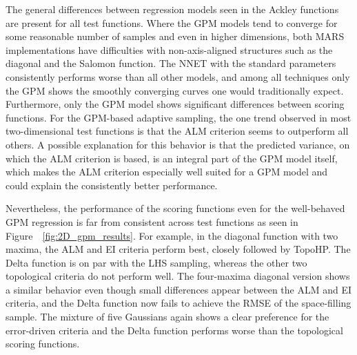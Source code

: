 The general differences between regression models seen in the Ackley functions are present for all test functions.
%
Where the GPM models tend to converge for some reasonable number of samples and even in higher dimensions, both MARS implementations have difficulties with non-axis-aligned structures such as the diagonal and the Salomon function.
%
The NNET with the standard parameters consistently performs worse than all other models, and among all techniques only the GPM shows the smoothly converging curves one would traditionally expect.
%
Furthermore, only the GPM model shows significant differences between scoring functions.
%
For the GPM-based adaptive sampling, the one trend observed in most two-dimensional test functions is that the ALM criterion seems to outperform all others.
%
A possible explanation for this behavior is that the predicted variance, on which the ALM criterion is based, is an integral part of the GPM model itself, which makes the ALM criterion especially well suited for a GPM model and could explain the consistently better performance.

Nevertheless, the performance of the scoring functions even for the well-behaved GPM regression is far from consistent across test functions as seen in Figure~~\ref{fig:2D_gpm_results}.
%
For example, in the diagonal function with two maxima, the ALM and EI criteria perform best, closely followed by TopoHP.
%
The Delta function is on par with the LHS sampling, whereas the other two topological criteria do not perform well.
%
The four-maxima diagonal version shows a similar behavior even though small differences appear between the ALM and EI criteria, and the Delta function now fails to achieve the RMSE of the space-filling sample.
%
The mixture of five Gaussians again shows a clear preference for the error-driven criteria and the Delta function performs worse than the topological scoring functions.

